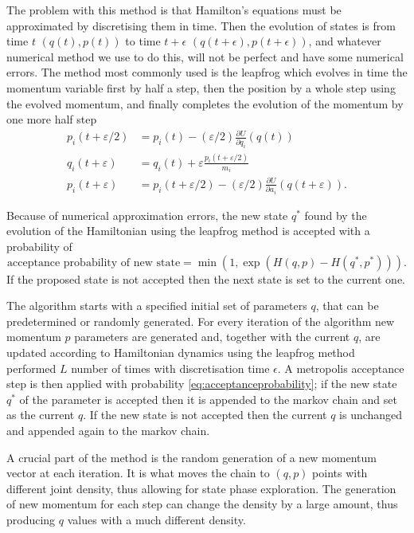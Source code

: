 The problem with this method is that Hamilton's equations must be approximated by discretising them in time. Then the evolution of states is from time $t$ $(q(t),p(t))$ to time $t+\epsilon$ $(q(t+\epsilon),p(t+\epsilon))$, and whatever numerical method we use to do this, will not be perfect and have some numerical errors. The method most commonly used is the leapfrog which evolves in time the momentum variable first by half a step, then the position by a whole step using the evolved momentum, and finally completes the evolution of the momentum by one more half step
\begin{align}
 p_{i}(t+\varepsilon / 2) &=p_{i}(t)-(\varepsilon / 2) \frac{\partial U}{\partial q_{i}}(q(t)) \\ q_{i}(t+\varepsilon) &=q_{i}(t)+\varepsilon \frac{p_{i}(t+\varepsilon / 2)}{m_{i}} \\ p_{i}(t+\varepsilon) &=p_{i}(t+\varepsilon / 2)-(\varepsilon / 2) \frac{\partial U}{\partial a_{i}}(q(t+\varepsilon)) .
\end{align}

Because of numerical approximation errors, the new state $q^*$ found by the evolution of the Hamiltonian using the leapfrog method is accepted with a probability of 
\begin{equation}
	\text{acceptance probability of new state} = \min(1,\exp \left(H(q,p) - H(q^*,p^*)\right) ).
	\label{eq:acceptanceprobability}
\end{equation}
If the proposed state is not accepted then the next state is set to the current one. 

The algorithm starts with a specified initial set of parameters $q$, that can be predetermined or randomly generated. For every iteration of the algorithm new momentum $p$ parameters are generated and, together with the current $q$, are updated according to Hamiltonian dynamics using the leapfrog method performed $L$ number of times with discretisation time $\epsilon$. A metropolis acceptance step is then applied with probability \eqref{eq:acceptanceprobability}; if the new state $q^*$ of the parameter is accepted then it is appended to the markov chain and set as the current $q$. If the new state is not accepted then the current $q$ is unchanged and appended again to the markov chain.

A crucial part of the method is the random generation of a new momentum vector at each iteration. It is what moves the chain to $(q,p)$ points with different joint density, thus allowing for state phase exploration. The generation of new momentum for each step can change the density by a large amount, thus producing $q$ values with a much different density.


